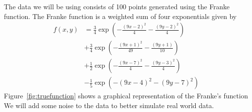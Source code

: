 \documentclass[twoside,11pt]{report}
\begin{document}
The data we will be using consists of 100 points generated using the Franke function. The Franke function is a weighted sum of four exponentials given by
\begin{align*}
    f(x,y) &= \frac{3}{4}\exp\left(-\frac{(9x-2)^2}{4}-\frac{(9y-2)^2}{4}\right)\\
    &+ \frac{3}{4}\exp\left(-\frac{(9x+1)^2}{49}-\frac{(9y+1)}{10}\right)\\
    &+ \frac{1}{2}\exp\left(-\frac{(9x-7)^2}{4}-\frac{(9y-3)^2}{4}\right)\\
    &- \frac{1}{5}\exp\left(-(9x-4)^2-(9y-7)^2\right)
\end{align*}
Figure~\ref{fig:truefunction} shows a graphical representation of the Franke's function\\
We will add some noise to the data to better simulate real world data. 
\end{document}
